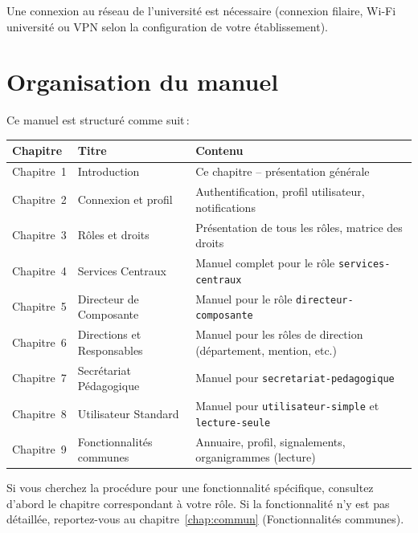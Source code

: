 \begin{notebox}
  Une connexion au r\'eseau de l'universit\'e est n\'ecessaire (connexion filaire, Wi-Fi universit\'e ou VPN selon la configuration de votre \'etablissement).
\end{notebox}

\section{Organisation du manuel}

Ce manuel est structur\'e comme suit\,:

\medskip
\begin{tabularx}{\textwidth}{C{2.5cm}L{4cm}X}
  \toprule
  \textbf{Chapitre} & \textbf{Titre} & \textbf{Contenu} \\
  \midrule
  Chapitre~1 & Introduction & Ce chapitre -- pr\'esentation g\'en\'erale \\
  Chapitre~2 & Connexion et profil & Authentification, profil utilisateur, notifications \\
  Chapitre~3 & R\^oles et droits & Pr\'esentation de tous les r\^oles, matrice des droits \\
  Chapitre~4 & Services Centraux & Manuel complet pour le r\^ole \texttt{services-centraux} \\
  Chapitre~5 & Directeur de Composante & Manuel pour le r\^ole \texttt{directeur-composante} \\
  Chapitre~6 & Directions et Responsables & Manuel pour les r\^oles de direction (d\'epartement, mention, etc.) \\
  Chapitre~7 & Secr\'etariat P\'edagogique & Manuel pour \texttt{secretariat-pedagogique} \\
  Chapitre~8 & Utilisateur Standard & Manuel pour \texttt{utilisateur-simple} et \texttt{lecture-seule} \\
  Chapitre~9 & Fonctionnalit\'es communes & Annuaire, profil, signalements, organigrammes (lecture) \\
  \bottomrule
\end{tabularx}

\medskip
\begin{tipbox}
  Si vous cherchez la proc\'edure pour une fonctionnalit\'e sp\'ecifique, consultez d'abord le chapitre correspondant \`a votre r\^ole. Si la fonctionnalit\'e n'y est pas d\'etaill\'ee, reportez-vous au chapitre~\ref{chap:commun} (Fonctionnalit\'es communes).
\end{tipbox}

